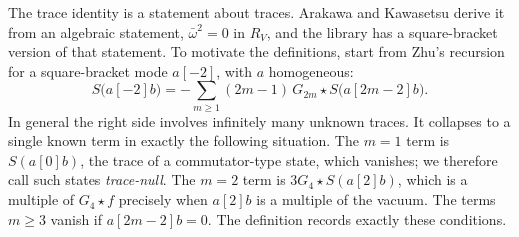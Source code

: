 The trace identity is a statement about traces. Arakawa and Kawasetsu derive it from an algebraic statement,
$\bar\omega^2=0$ in $R_V$, and the library has a square-bracket version of that statement. To motivate the definitions,
start from Zhu's recursion for a square-bracket mode $a[-2]$, with $a$ homogeneous:
\begin{equation}\label{l25:eq:zhuminus2}
S\big(a[-2]b\big)=-\sum_{m\ge1}(2m-1)\,G_{2m}\star S\big(a[2m-2]b\big).
\end{equation}
In general the right side involves infinitely many unknown traces. It collapses to a single known term in exactly
the following situation. The $m=1$ term is $S(a[0]b)$, the trace of a commutator-type state, which vanishes; we
therefore call such states \emph{trace-null}. The $m=2$ term is $3G_4\star S(a[2]b)$, which is a multiple of $G_4\star f$
precisely when $a[2]b$ is a multiple of the vacuum. The terms $m\ge3$ vanish if $a[2m-2]b=0$. The definition records
exactly these conditions.

